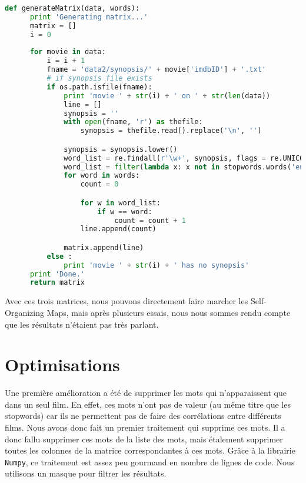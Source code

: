 \begin{lstlisting}[language=python]
  def generateMatrix(data, words):
      print 'Generating matrix...'
      matrix = []
      i = 0
    
      for movie in data:
          i = i + 1
          fname = 'data2/synopsis/' + movie['imdbID'] + '.txt'
          # if synopsis file exists
          if os.path.isfile(fname):
              print 'movie ' + str(i) + ' on ' + str(len(data))
              line = []
              synopsis = ''
              with open(fname, 'r') as thefile:
                  synopsis = thefile.read().replace('\n', '')

              synopsis = synopsis.lower()
              word_list = re.findall(r'\w+', synopsis, flags = re.UNICODE | re.LOCALE) 
              word_list = filter(lambda x: x not in stopwords.words('english'), word_list)
              for word in words:
                  count = 0

                  for w in word_list:
                      if w == word:
                          count = count + 1
                  line.append(count)

              matrix.append(line)
          else :
              print 'movie ' + str(i) + ' has no synopsis'
      print 'Done.'
      return matrix
\end{lstlisting}

Avec ces trois matrices, nous pouvons directement faire marcher les Self-Organizing Maps, mais après plusieurs essais, nous nous sommes rendu compte que les résultats n'étaient pas très parlant.

\section{Optimisations}

Une première amélioration a été de supprimer les mots qui n'apparaissent que dans un seul film. En effet, ces mots n'ont pas de valeur (au même titre que les stopwords) car ils ne permettent pas de faire des corrélations entre différents films. Nous avons donc fait un premier traitement qui supprime ces mots. Il a donc fallu supprimer ces mots de la liste des mots, mais étalement supprimer toutes les colonnes de la matrice correspondantes à ces mots. Grâce à la librairie \texttt{Numpy}, ce traitement est assez peu gourmand en nombre de lignes de code. Nous utilisons un masque pour filtrer les résultats. \\

